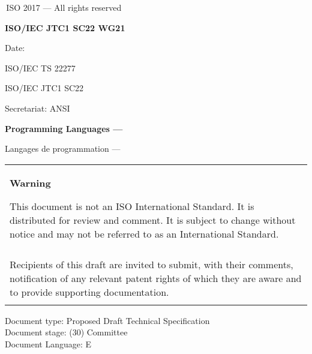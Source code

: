 

\thispagestyle{empty}
{\raisebox{.35ex}{\smaller\copyright}}\,ISO 2017 --- All rights reserved
\vspace{2ex}

\begin{flushright}
	\textbf{ISO/IEC JTC1 SC22 WG21 \,\LARGE\docno} %
	
	Date: \reldate
	
	ISO/IEC TS 22277
	
	ISO/IEC JTC1 SC22
	
	Secretariat: ANSI
	
\end{flushright}

\vfill

\textbf{\LARGE Programming Languages --- \doctitle}

Langages de programmation --- \frtitle

\vfill

\begin{tabular}{|p{\hsize}|}
	\hline
	\begin{center}
		\textbf{Warning}
	\end{center}
	
	\vspace{2ex}
	
	This document is not an ISO International Standard. It is distributed
	for review and comment. It is subject to change without notice and may
	not be referred to as an International Standard.\\\\
	
	Recipients of this draft are invited to submit, with their comments,
	notification of any relevant patent rights of which they are aware
	and to provide supporting documentation.\\\\
	\hline
\end{tabular}

\vfill
\noindent
Document type: Proposed Draft Technical Specification\\
Document stage: (30) Committee\\
Document Language: E
\pagebreak

\thispagestyle{cpppage}

